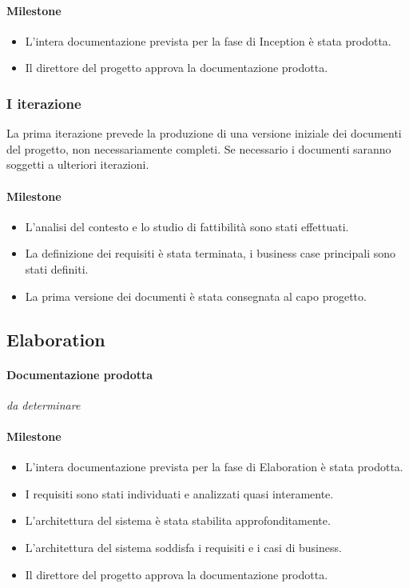 \paragraph{Milestone}
\begin{itemize}
	\item L'intera documentazione prevista per la fase di Inception \`e stata prodotta.
	\item Il direttore del progetto approva la documentazione prodotta.
\end{itemize}

\subsubsection{I iterazione}

La prima iterazione prevede la produzione di una versione iniziale dei documenti del progetto, non necessariamente completi.
Se necessario i documenti saranno soggetti a ulteriori iterazioni.

\paragraph{Milestone}
\begin{itemize}
	\item L'analisi del contesto e lo studio di fattibilit\`a sono stati effettuati.
	\item La definizione dei requisiti \`e stata terminata, i business case principali sono stati definiti.
	\item La prima versione dei documenti \`e stata consegnata al capo progetto.
\end{itemize}

\subsection{Elaboration}

\paragraph{Documentazione prodotta}
\emph{da determinare}

\paragraph{Milestone}
\begin{itemize}
	\item L'intera documentazione prevista per la fase di Elaboration \`e stata prodotta.
	\item I requisiti sono stati individuati e analizzati quasi interamente.
	\item L'architettura del sistema \`e stata stabilita approfonditamente.
	\item L'architettura del sistema soddisfa i requisiti e i casi di business.
	\item Il direttore del progetto approva la documentazione prodotta.
\end{itemize}

